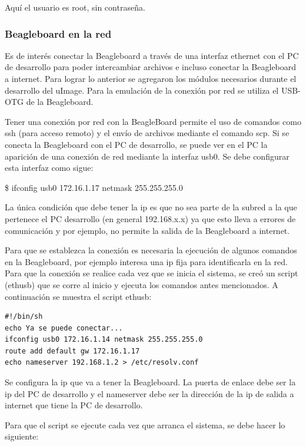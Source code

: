 Aquí el usuario es root, sin contraseña.

\subsubsection{Beagleboard en la red}

Es de interés conectar la Beagleboard a través de una interfaz ethernet con el PC de desarrollo para poder intercambiar archivos e incluso conectar la Beagleboard a internet. Para lograr lo anterior se agregaron los módulos necesarios durante el desarrollo del uImage. Para la emulación de la conexión por red se utiliza el USB-OTG de la Beagleboard.

\bigskip
{}

\bigskip
Tener una conexión por red con la BeagleBoard permite el uso de comandos como ssh (para acceso remoto) y el envío de archivos mediante el comando scp. 
Si se conecta la Beagleboard con el PC de desarrollo, se puede ver en el PC la aparición de una conexión de red mediante la interfaz usb0. Se debe configurar esta interfaz como sigue:

\bigskip
\centerline{\$ ifconfig usb0 172.16.1.17 netmask 255.255.255.0}

\bigskip
La única condición que debe tener la ip es que no sea parte de la subred a la que pertenece el PC desarrollo (en general 192.168.x.x) ya que esto lleva a errores de comunicación y por ejemplo, no permite la salida de la Beagleboard a internet.

\bigskip
Para que se establezca la conexión es necesaria la ejecución de algunos comandos en la Beagleboard, por ejemplo interesa una ip fija para identificarla en la red. Para que la conexión se realice cada vez que se inicia el sistema, se creó un script (ethusb) que se corre al inicio y ejecuta los comandos antes mencionados.
A continuación se muestra el script ethusb:

\begin{verbatim}
#!/bin/sh 
echo Ya se puede conectar... 
ifconfig usb0 172.16.1.14 netmask 255.255.255.0 
route add default gw 172.16.1.17 
echo nameserver 192.168.1.2 > /etc/resolv.conf 
\end{verbatim}

Se configura la ip que va a tener la Beagleboard. La puerta de enlace debe ser la ip del PC de desarrollo y el nameserver debe ser la dirección de la ip de salida a internet que tiene la PC de desarrollo.

\bigskip
Para que el script se ejecute cada vez que arranca el sistema, se debe hacer lo siguiente:

